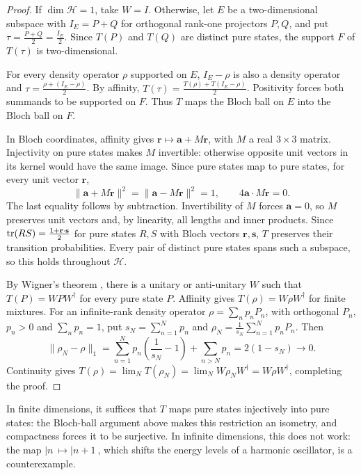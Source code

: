 \documentclass{techbrief}
\begin{document}
\begin{proof}
	If $\dim\mathcal{H}=1$, take $W=I$. Otherwise, let $E$ be a two-dimensional subspace with $I_E=P+Q$ for orthogonal rank-one projectors $P,Q$, and put $\tau=\frac{P+Q}{2}=\frac{I_E}{2}$. Since $T(P)$ and $T(Q)$ are distinct pure states, the support $F$ of $T(\tau)$ is two-dimensional.

	For every density operator $\rho$ supported on $E$, $I_E-\rho$ is also a density operator and $\tau=\frac{\rho+(I_E-\rho)}{2}$. By affinity, $T(\tau)=\frac{T(\rho)+T(I_E-\rho)}{2}$. Positivity forces both summands to be supported on $F$. Thus $T$ maps the Bloch ball on $E$ into the Bloch ball on $F$.

	In Bloch coordinates, affinity gives $\mathbf{r}\mapsto\mathbf{a}+M\mathbf{r}$, with $M$ a real $3\times3$ matrix. Injectivity on pure states makes $M$ invertible: otherwise opposite unit vectors in its kernel would have the same image. Since pure states map to pure states, for every unit vector $\mathbf{r}$,
	\begin{equation*}
		\|\mathbf{a}+M\mathbf{r}\|^2=\|\mathbf{a}-M\mathbf{r}\|^2=1,\qquad 4\mathbf{a}\cdot M\mathbf{r}=0.
	\end{equation*}
	The last equality follows by subtraction. Invertibility of $M$ forces $\mathbf{a}=0$, so $M$ preserves unit vectors and, by linearity, all lengths and inner products. Since $\operatorname{tr}(RS)=\frac{1+\mathbf{r}\cdot\mathbf{s}}{2}$ for pure states $R,S$ with Bloch vectors $\mathbf{r},\mathbf{s}$, $T$ preserves their transition probabilities. Every pair of distinct pure states spans such a subspace, so this holds throughout $\mathcal{H}$.

	By Wigner's theorem \cite[Theorem~5.29]{Landsman2017}, there is a unitary or anti-unitary $W$ such that $T(P)=WPW^\dagger$ for every pure state $P$. Affinity gives $T(\rho)=W\rho W^\dagger$ for finite mixtures. For an infinite-rank density operator $\rho=\sum_n p_nP_n$, with orthogonal $P_n$, $p_n>0$ and $\sum_n p_n=1$, put $s_N=\sum_{n=1}^Np_n$ and $\rho_N=\frac{1}{s_N}\sum_{n=1}^Np_nP_n$. Then
	\begin{equation*}
		\|\rho_N-\rho\|_1=\sum_{n=1}^Np_n\left(\frac{1}{s_N}-1\right)+\sum_{n>N}p_n=2(1-s_N)\longrightarrow0.
	\end{equation*}
	Continuity gives $T(\rho)=\lim_NT(\rho_N)=\lim_NW\rho_NW^\dagger=W\rho W^\dagger$, completing the proof.
\end{proof}

\begin{remark}
	In finite dimensions, it suffices that $T$ maps pure states injectively into pure states: the Bloch-ball argument above makes this restriction an isometry, and compactness forces it to be surjective. In infinite dimensions, this does not work: the map $|n\> \mapsto |n+1\>$, which shifts the energy levels of a harmonic oscillator, is a counterexample.
\end{remark}
\end{document}
